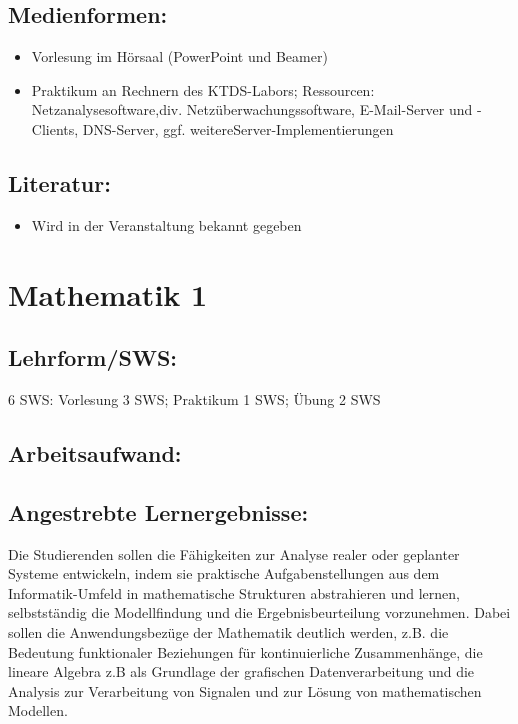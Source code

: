 \section{Medienformen:}\label{medienformen-12}

\begin{itemize}
\tightlist
\item
  Vorlesung im Hörsaal (PowerPoint und Beamer)\\
\item
  Praktikum an Rechnern des KTDS-Labors; Ressourcen:
  Netzanalysesoftware,div. Netzüberwachungssoftware, E-Mail-Server und
  -Clients, DNS-Server, ggf. weitereServer-Implementierungen
\end{itemize}

\section{Literatur:}\label{literatur-12}

\begin{itemize}
\tightlist
\item
  Wird in der Veranstaltung bekannt gegeben
\end{itemize}

\chapter{Mathematik 1}\label{mathematik-1}

\section{Lehrform/SWS:}\label{lehrformsws-13}

6 SWS: Vorlesung 3 SWS; Praktikum 1 SWS; Übung 2 SWS

\section{Arbeitsaufwand:}\label{arbeitsaufwand-13}

\section{Angestrebte
Lernergebnisse:}\label{angestrebte-lernergebnisse-13}

Die Studierenden sollen die Fähigkeiten zur Analyse realer oder
geplanter Systeme entwickeln, indem sie praktische Aufgabenstellungen
aus dem Informatik-Umfeld in mathematische Strukturen abstrahieren und
lernen, selbstständig die Modellfindung und die Ergebnisbeurteilung
vorzunehmen. Dabei sollen die Anwendungsbezüge der Mathematik deutlich
werden, z.B. die Bedeutung funktionaler Beziehungen für kontinuierliche
Zusammenhänge, die lineare Algebra z.B als Grundlage der grafischen
Datenverarbeitung und die Analysis zur Verarbeitung von Signalen und zur
Lösung von mathematischen Modellen.

